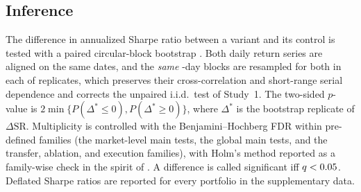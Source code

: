 \subsection{Inference}
\label{sec:inference}

The difference in annualized Sharpe ratio between a variant and its control is tested with a paired circular-block
bootstrap \cite{politis1992circular,ledoit2008robust}. Both daily return series are aligned on the same dates, and
the \emph{same} \STwoBlock-day blocks are resampled for both in each of \STwoBoot{} replicates, which preserves their
cross-correlation and short-range serial dependence and corrects the unpaired i.i.d.\ test of Study~1. The two-sided
$p$-value is $2\min\{P(\Delta^{*} \leq 0), P(\Delta^{*} \geq 0)\}$, where $\Delta^{*}$ is the bootstrap replicate of
$\Delta\mathrm{SR}$. Multiplicity is controlled with the Benjamini--Hochberg FDR \cite{benjamini1995fdr} within
pre-defined families (the \STwoMktTests{} market-level main tests, the \STwoGlobTests{} global main tests, and the
transfer, ablation, and execution families), with Holm's method \cite{holm1979simple} reported as a family-wise check
in the spirit of \cite{harvey2016cross,sullivan1999data}. A difference is called significant iff $q < 0.05$.
Deflated Sharpe ratios \cite{bailey2014deflated} are reported for every portfolio in the supplementary data.
